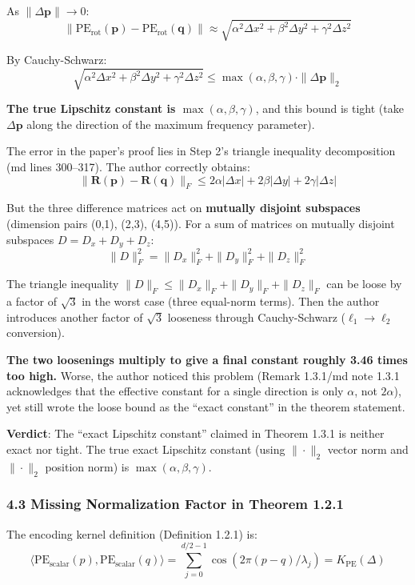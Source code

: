 \documentclass[
  12pt,
]{article}
\begin{document}
As $\|\Delta\mathbf{p}\| \to 0$:
\[\|\text{PE}_{\text{rot}}(\mathbf{p}) - \text{PE}_{\text{rot}}(\mathbf{q})\| \approx \sqrt{\alpha^2\Delta x^2 + \beta^2\Delta y^2 + \gamma^2\Delta z^2}\]

By Cauchy-Schwarz:
\[\sqrt{\alpha^2\Delta x^2 + \beta^2\Delta y^2 + \gamma^2\Delta z^2} \leq \max(\alpha, \beta, \gamma) \cdot \|\Delta\mathbf{p}\|_2\]

\textbf{The true Lipschitz constant is $\max(\alpha, \beta, \gamma)$}, and this bound is tight (take $\Delta\mathbf{p}$ along the direction of the maximum frequency parameter).

The error in the paper's proof lies in Step 2's triangle inequality decomposition (md lines 300--317). The author correctly obtains:
\[\|\mathbf{R}(\mathbf{p}) - \mathbf{R}(\mathbf{q})\|_F \leq 2\alpha|\Delta x| + 2\beta|\Delta y| + 2\gamma|\Delta z|\]

But the three difference matrices act on \textbf{mutually disjoint subspaces} (dimension pairs (0,1), (2,3), (4,5)). For a sum of matrices on mutually disjoint subspaces $D = D_x + D_y + D_z$:
\[\|D\|_F^2 = \|D_x\|_F^2 + \|D_y\|_F^2 + \|D_z\|_F^2\]

The triangle inequality $\|D\|_F \leq \|D_x\|_F + \|D_y\|_F + \|D_z\|_F$ can be loose by a factor of $\sqrt{3}$ in the worst case (three equal-norm terms). Then the author introduces another factor of $\sqrt{3}$ looseness through Cauchy-Schwarz ($\ell_1 \to \ell_2$ conversion).

\textbf{The two loosenings multiply to give a final constant roughly 3.46 times too high.} Worse, the author noticed this problem (Remark 1.3.1/md note 1.3.1 acknowledges that the effective constant for a single direction is only $\alpha$, not $2\alpha$), yet still wrote the loose bound as the ``exact constant'' in the theorem statement.

\textbf{Verdict}: The ``exact Lipschitz constant'' claimed in Theorem 1.3.1 is neither exact nor tight. The true exact Lipschitz constant (using $\|\cdot\|_2$ vector norm and $\|\cdot\|_2$ position norm) is $\max(\alpha, \beta, \gamma)$.

\subsubsection{4.3 Missing Normalization Factor in Theorem 1.2.1}\label{missing-normalization-thm-1.2.1}

The encoding kernel definition (Definition 1.2.1) is:
\[\langle \text{PE}_{\text{scalar}}(p), \text{PE}_{\text{scalar}}(q) \rangle = \sum_{j=0}^{d/2-1} \cos(2\pi(p-q)/\lambda_j) = K_{\text{PE}}(\Delta)\]
\end{document}
